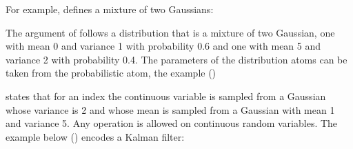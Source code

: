 \documentclass[letterpaper,10pt,english]{sphinxmanual}
\begin{document}
For example,  defines a mixture of two Gaussians:

\begin{sphinxVerbatim}[commandchars=\\\{\}]
  
  
   
   
\end{sphinxVerbatim}

The argument  of  follows a distribution that is a mixture of two Gaussian, one with mean 0 and variance 1 with probability 0.6 and one with mean 5 and variance 2 with probability 0.4.
The parameters of the distribution atoms can be taken from the probabilistic atom, the example ()

\begin{sphinxVerbatim}[commandchars=\\\{\}]
 
  
  
\end{sphinxVerbatim}

states that for an index  the continuous variable  is sampled from a Gaussian whose variance is 2 and whose mean is sampled from a Gaussian with mean 1 and variance 5.
Any operation is allowed on continuous random variables.
The example below () encodes a Kalman filter:
\end{document}

